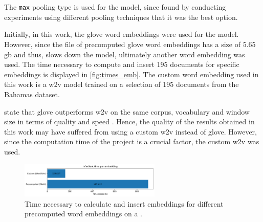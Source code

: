\section{\infersent{}}\label{sec:evaluation-inferSent}

The \texttt{max} pooling type is used for the \infersent{} model, since \citeauthor{inferSent2018} 
found by conducting experiments using different pooling techniques that it was the best option.

Initially, in this work, the \ac{glove} word embeddings were used for the \infersent{} model.
However, since the file of precomputed \acs{glove} word embeddings has a size of 5.65 \ac{gb} and thus,
slows down the model, ultimately another word embedding was used.
The time necessary to compute and insert 195 documents for specific embeddings is displayed in \autoref{fig:times_emb}.
The custom word embedding used in this work is a \ac{w2v} model trained on a selection of 195 documents from the Bahamas dataset.

\citeauthor{glove2014} state that \acs{glove} outperforms \ac{w2v} on the same corpus, 
vocabulary and window size in terms of quality and speed \cite{glove2014}.
Hence, the quality of the results obtained in this work may have suffered from using a custom \ac{w2v} instead of \acs{glove}.
However, since the computation time of the project is a crucial factor, the custom \ac{w2v} was used.

\begin{figure}%
    \centering
    \includegraphics[width=0.6\textwidth]{images/embeddings/infersent/InferSent_time_per_embedding.pdf}
    \caption{Time necessary to calculate and insert \infersent{} embeddings for different precomputed word embeddings on a \localMaschineStats{}.
    }
    \label{fig:times_emb}%
\end{figure}
